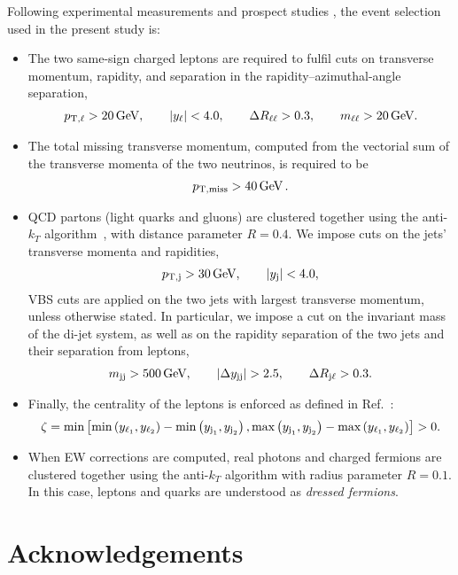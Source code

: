 \documentclass[11pt,epsf]{article}
\begin{document}
    Following experimental measurements \cite{Aad:2014zda,Aaboud:2016ffv,Khachatryan:2014sta,CMS:2017adb} and prospect studies \cite{ATL-PHYS-PUB-2017-023}, the event selection used in the present study is:

    \begin{itemize}
        \item The two same-sign charged leptons are required to fulfil cuts on transverse momentum, rapidity, and separation in the rapidity--azimuthal-angle separation, 
            \begin{align}
            \label{cut:1}
             p_{\text{T},\ell} >  20\,\text{GeV},\qquad |y_{\ell}| < 4.0, \qquad \Delta R_{\ell\ell}> 0.3, \qquad m_{\ell\ell}>20\,\text{GeV}.
            \end{align}
        \item The total missing transverse momentum, computed from the vectorial sum of the transverse momenta of the two neutrinos, is required to be
            \begin{align}
            \label{cut:2}
              p_{\rm T, miss} >  40\,\text{GeV}\,.
            \end{align}
        \item QCD partons (light quarks and gluons) are clustered together using the anti-$k_T$ algorithm~\cite{Cacciari:2008gp}, with distance parameter $R=0.4$.
        We impose cuts on the jets' transverse momenta and rapidities,  
            \begin{align}
            \label{cut:3}
             p_{\text{T},\text{j}} >  30\,\text{GeV}, \qquad |y_\text{j}| < 4.0, 
            \end{align}
            VBS cuts are applied on the two jets with largest transverse momentum, unless otherwise stated. In particular, we impose a cut on the 
             in\-vari\-ant mass of the di-jet system, as well as on the rapidity separation of the two jets and their separation from leptons,
            \begin{align}
            \label{cut:4}
             m_{\text{j} \text{j}} >  500\,\text{GeV},\qquad |\Delta y_{\text{j} \text{j}}| > 2.5, \qquad \Delta R_{\text{j}\ell} > 0.3 .
            \end{align}
        \item Finally, the centrality of the leptons is enforced as defined in Ref.~\cite{ATL-PHYS-PUB-2017-023}:
            \begin{align}
            \label{cut:5}
             \zeta = \text{min}\left[\text{min}\left(y_{\ell_1},y_{\ell_2}\right) - \text{min}\left(y_{\text{j}_1},y_{\text{j}_2}\right), \text{max}\left(y_{\text{j}_1},y_{\text{j}_2}\right) - \text{max}\left(y_{\ell_1},y_{\ell_2}\right)\right]> 0 .
            \end{align}
            
        \item When EW corrections are computed, real photons and charged fermions are clustered together using the anti-$k_T$ algorithm with
            radius parameter $R=0.1$. In this case, leptons and quarks are understood as {\it dressed fermions}.
    \end{itemize}
    
\section*{Acknowledgements}

\appendix




\end{document}
